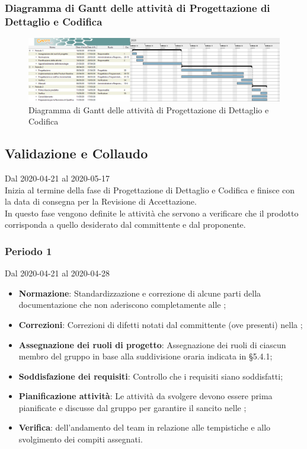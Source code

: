 \newpage
\begin{landscape}
\subsubsection{Diagramma di Gantt delle attività di Progettazione di Dettaglio e Codifica}
\pagestyle{empty}
\begin{figure}[h]
	\centering
	\includegraphics[scale=0.476]{Sezioni/DiagrammiGantt/ProgettazioneDiDettaglio.png}
	\caption{Diagramma di Gantt delle attività di Progettazione di Dettaglio e Codifica}
\end{figure}
\end{landscape}

\subsection{Validazione e Collaudo}
Dal 2020-04-21 al 2020-05-17\\
Inizia al termine della fase di Progettazione di Dettaglio e Codifica e finisce con la data di consegna per la Revisione di Accettazione.\\
In questo fase vengono definite le attività che servono a verificare che il prodotto corrisponda a quello desiderato dal committente e dal proponente.

\subsubsection{Periodo 1} 
Dal 2020-04-21 al 2020-04-28
\begin{itemize}
	\item \textbf{Normazione}: Standardizzazione e correzione di alcune parti della documentazione che non aderiscono completamente alle \NdP{};
	\item \textbf{Correzioni}: Correzioni di difetti notati dal committente (ove presenti) nella ;
	\item \textbf{Assegnazione dei ruoli di progetto}: Assegnazione dei ruoli di ciascun membro del gruppo in base alla suddivisione oraria indicata in §5.4.1;
	\item \textbf{Soddisfazione dei requisiti}: Controllo che i requisiti siano soddisfatti;
	\item \textbf{Pianificazione attività}: Le attività da svolgere devono essere prima pianificate e discusse dal gruppo per garantire il  sancito nelle \NdP{};
	\item \textbf{Verifica}:  dell'andamento del team in relazione alle tempistiche e allo svolgimento dei compiti assegnati.
\end{itemize}

